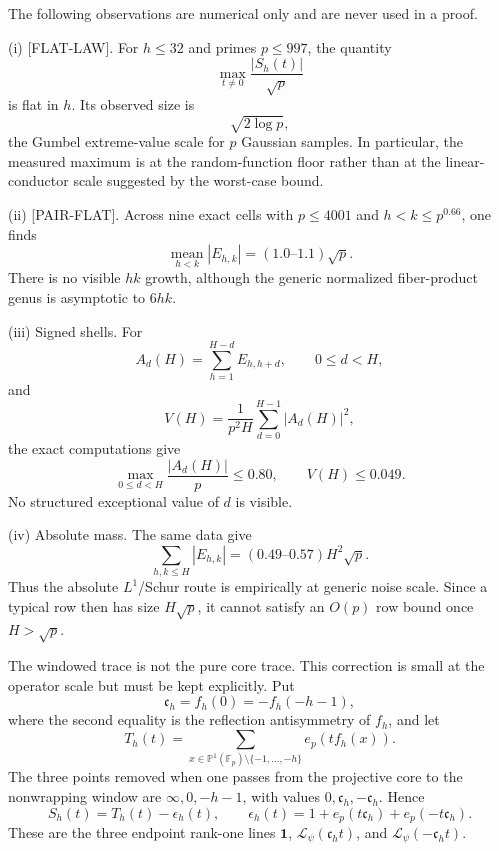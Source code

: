 \begin{remark}
\label{gram-numerical-laws}
The following observations are numerical only and are never used in a
proof.

\smallskip
\noindent
\textnormal{\rm(i) [FLAT-LAW].}
For $h\le32$ and primes $p\le997$, the quantity
\[
 \max_{t\ne0}\frac{|S_h(t)|}{\sqrt p}
\]
is flat in $h$.  Its observed size is
\[
 \sqrt{2\log p},
\]
the Gumbel extreme-value scale for $p$ Gaussian samples.  In particular,
the measured maximum is at the random-function floor rather than at the
linear-conductor scale suggested by the worst-case bound.

\smallskip
\noindent
\textnormal{\rm(ii) [PAIR-FLAT].}
Across nine exact cells with $p\le4001$ and
$h<k\le p^{0.66}$, one finds
\[
 \operatorname*{mean}_{h<k}|E_{h,k}|
 =(1.0\text{--}1.1)\sqrt p.
\]
There is no visible $hk$ growth, although the generic normalized
fiber-product genus is asymptotic to $6hk$.

\smallskip
\noindent
\textnormal{\rm(iii) Signed shells.}
For
\[
 A_d(H)=\sum_{h=1}^{H-d}E_{h,h+d},
 \qquad 0\le d<H,
\]
and
\[
 V(H)=\frac{1}{p^2H}\sum_{d=0}^{H-1}|A_d(H)|^2,
\]
the exact computations give
\[
 \max_{0\le d<H}\frac{|A_d(H)|}{p}\le0.80,
 \qquad V(H)\le0.049.
\]
No structured exceptional value of $d$ is visible.

\smallskip
\noindent
\textnormal{\rm(iv) Absolute mass.}
The same data give
\[
 \sum_{h,k\le H}|E_{h,k}|
 =(0.49\text{--}0.57)H^2\sqrt p.
\]
Thus the absolute $L^1$/Schur route is empirically at generic noise
scale.  Since a typical row then has size $H\sqrt p$, it cannot satisfy
an $O(p)$ row bound once $H>\sqrt p$.
\end{remark}

The windowed trace is not the pure core trace.  This correction is
small at the operator scale but must be kept explicitly.  Put
\[
 \mathfrak c_h=f_h(0)=-f_h(-h-1),
\]
where the second equality is the reflection antisymmetry of $f_h$, and
let
\[
 T_h(t)=\sum_{x\in
 \mathbb P^1(\mathbb F_p)\setminus\{-1,\ldots,-h\}}
 e_p(tf_h(x)).
\]
The three points removed when one passes from the projective core to the
nonwrapping window are $\infty,0,-h-1$, with values
$0,\mathfrak c_h,-\mathfrak c_h$.  Hence
\begin{equation}
 S_h(t)=T_h(t)-\epsilon_h(t),\qquad
 \epsilon_h(t)=1+e_p(t\mathfrak c_h)+e_p(-t\mathfrak c_h).
 \label{gram-endpoint-trace}
\end{equation}
These are the three endpoint rank-one lines
$\mathbf 1$, $\mathcal L_\psi(\mathfrak c_ht)$, and
$\mathcal L_\psi(-\mathfrak c_ht)$.

